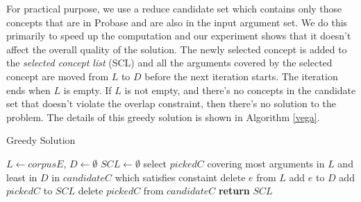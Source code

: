 For practical purpose, we use a reduce candidate set which contains only
those concepts that are in Probase and are also in the input
argument set. We do this primarily to speed up the computation and
our experiment shows that it doesn't affect the overall quality of
the solution.
The newly selected concept is added to the {\em selected concept list}
(SCL) and all the arguments covered by the selected concept are moved
from $L$ to $D$ before the next iteration starts.
The iteration ends when $L$ is empty.
If $L$ is not empty, and there's no concepts in the candidate set
that doesn't violate the overlap constraint, then there's no
solution to the problem. The details of this greedy solution is shown
in Algorithm \ref{vega}.

\begin{algorithm}[th]
\caption{Greedy Solution}
\label{vega}
\begin{algorithmic}[1]
{}
\State $L \leftarrow corpusE$, $D \leftarrow \emptyset$
\State $SCL \leftarrow \emptyset$
\Repeat
\State select $pickedC$ covering most arguments in $L$ and least in $D$ in $candidateC$ which satisfies constaint
\State delete $e$ from $L$
\State add $e$ to $D$
\EndFor
\State add $pickedC$ to $SCL$
\State delete $pickedC$ from $candidateC$
\State \textbf{return} $SCL$
\EndFunction
\end{algorithmic}
\end{algorithm}


%




